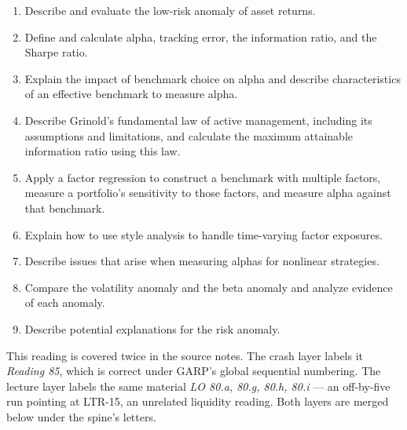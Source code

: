 

\begin{imkeybox}[title={The nine objectives in this reading}]
\begin{enumerate}[label=\textbf{\alph*.}]
\item Describe and evaluate the low-risk anomaly of asset returns.
\item Define and calculate alpha, tracking error, the information ratio, and the Sharpe ratio.
\item Explain the impact of benchmark choice on alpha and describe characteristics of an effective benchmark to measure alpha.
\item Describe Grinold's fundamental law of active management, including its assumptions and limitations, and calculate the maximum attainable information ratio using this law.
\item Apply a factor regression to construct a benchmark with multiple factors, measure a portfolio's sensitivity to those factors, and measure alpha against that benchmark.
\item Explain how to use style analysis to handle time-varying factor exposures.
\item Describe issues that arise when measuring alphas for nonlinear strategies.
\item Compare the volatility anomaly and the beta anomaly and analyze evidence of each anomaly.
\item Describe potential explanations for the risk anomaly.
\end{enumerate}
\end{imkeybox}

\begin{imtrapbox}[breakable=false,title={Two layers, two numbering schemes}]
This reading is covered twice in the source notes. The crash layer labels it
\emph{Reading 85}, which is correct under GARP's global sequential numbering.
The lecture layer labels the same material \emph{LO 80.a, 80.g, 80.h, 80.i} ---
an off-by-five run pointing at LTR-15, an unrelated liquidity reading. Both
layers are merged below under the spine's letters.
\end{imtrapbox}


